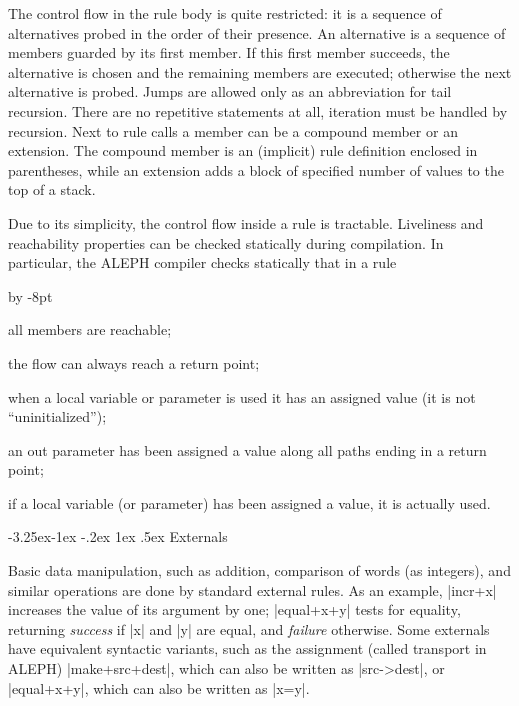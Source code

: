 \documentclass[titlepage]{article}
\makeatletter
\newcommand\A{\textsf{ALEPH}}
\newcommand\g[1]{\textsf{#1}}
\renewenvironment{itemize}{\begin{list}{}{%
\advance\leftmargin by -8pt%
\setlength\itemsep{0ex plus 0.2ex}%
\setlength\partopsep{3pt}%
\setlength\topsep{2pt plus 2pt}%
\setlength\parsep{0pt plus 2pt}%
}}{\end{list}}
\renewcommand\subsection{%
\@startsection{subsection}{2}{\z@}%
   {-3.25ex\@plus -1ex \@minus -.2ex}%
   {1ex \@plus .5ex}%
   {\normalfont\normalsize\bfseries}}
\makeatother
\begin{document}
The control flow in the rule body is quite restricted: it is a sequence of
alternatives probed in the order of their presence. An alternative is a
sequence of members guarded by its first member. If this first member
succeeds, the alternative is chosen and the remaining members are executed;
otherwise the next alternative is probed. Jumps are allowed only as an
abbreviation for tail recursion. There are no repetitive statements at all,
iteration must be handled by recursion. Next to rule calls a member can be a
\g{compound member} or an \g{extension}. The compound member is an
(implicit) rule definition enclosed in parentheses, while an extension adds
a block of specified number of values to the top of a \g{stack}.

Due to its simplicity, the control flow inside a rule is tractable.
Liveliness and reachability properties can be checked statically during
compilation. In particular, the \A{} compiler checks statically that in a
rule
\begin{itemize}
\item[\textbullet] all members are reachable;
\item[\textbullet] the flow can always reach a return point;
\item[\textbullet] when a local variable or parameter is used it has an
  assigned value (it is not ``uninitialized'');
\item[\textbullet] an out parameter has been assigned a value along all paths
 ending in a return point;
\item[\textbullet] if a local variable (or parameter) has been assigned a
value, it is actually used.
\end{itemize}

\subsection{Externals}\label{subsec:bird-ext}

Basic data manipulation, such as addition, comparison of words (as
integers), and similar operations are done by standard external rules. As
an example, \pp|incr+x| increases the value of its argument by one;
\pp|equal+x+y| tests for equality, returning \emph{success} if \pp|x| and
\pp|y| are equal, and \emph{failure} otherwise. Some externals have
equivalent syntactic variants, such as the assignment (called \g{transport}
in \A) \pp|make+src+dest|, which can also be written as \pp|src->dest|, or
\pp|equal+x+y|, which can also be written as \pp|x=y|.
\end{document}
